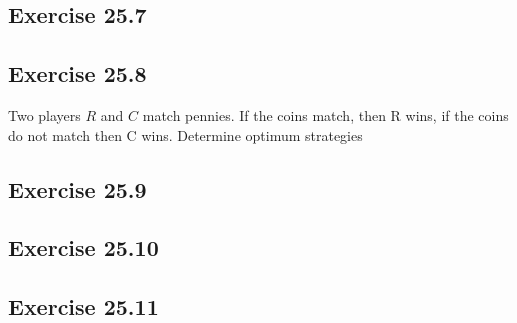 \documentclass[]{report}
\begin{document}
\subsection{Exercise 25.7}
\subsection{Exercise 25.8}
Two players $R$ and $C$ match pennies. If the coins match, then R wins, if the coins
do not match then C wins. Determine optimum strategies
\subsection{Exercise 25.9}
\subsection{Exercise 25.10}
\subsection{Exercise 25.11}
\end{document}
